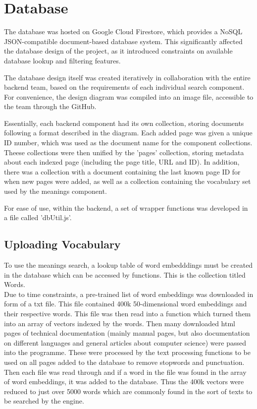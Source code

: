 \section{Database}

The database was hosted on Google Cloud Firestore, which provides a NoSQL JSON-compatible document-based database system. This significantly affected the database design of the project, as it introduced constraints on available database lookup and filtering features.

The database design itself was created iteratively in collaboration with the entire backend team, based on the requirements of each individual search component. For convenience, the design diagram was compiled into an image file, accessible to the team through the GitHub.

Essentially, each backend component had its own collection, storing documents following a format described in the diagram. Each added page was given a unique ID number, which was used as the document name for the component collections. Theese collections were then unified by the 'pages' collection, storing metadata about each indexed page (including the page title, URL and ID). In addition, there was a collection with a document containing the last known page ID for when new pages were added, as well as a collection containing the vocabulary set used by the meanings component.

For ease of use, within the backend, a set of wrapper functions was developed in a file called 'dbUtil.js'.


\subsection{Uploading Vocabulary}
To use the meanings search, a lookup table of word embedddings must be created in the database which can be accessed by functions. This is the collection titled Words. \\
Due to time constraints, a pre-trained list of word embeddings was downloaded in form of a txt file. This file contained 400k 50-dimensional word embeddings and their respective words. 
This file was then read into a function which turned them into an array of vectors indexed by the words. Then many downloaded html pages of technical documentation (mainly manual pages, but also documentation on different languages and general articles about computer science) were passed into the programme. These were processed by the text processing functions to be used on all pages added to the database to remove stopwords and punctuation. Then each file was read through and if a word in the file was found in the array of word embeddings, it was added to the database. Thus the 400k vectors were reduced to just over 5000 words which are commonly found in the sort of texts to be searched by the engine.    

